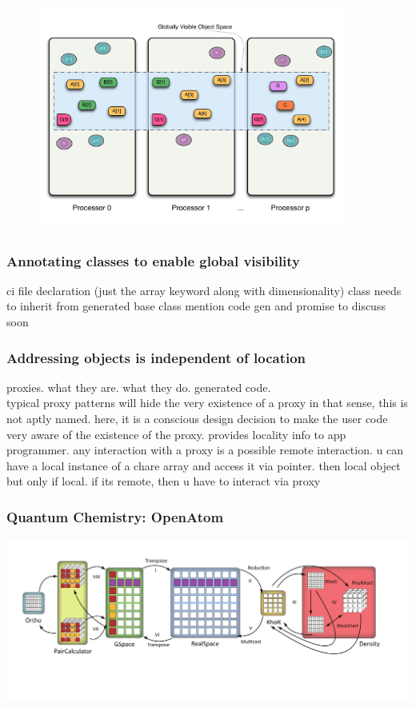 \begin{frame}
  \frametitle{
  }
  \begin{figure}\includegraphics[width=0.9\textwidth]{../figures/progmodel/07-obj-programmer-view.pdf}\end{figure}
\end{frame}


\begin{frame}
  \frametitle{Annotating classes to enable global visibility}
  ci file declaration (just the array keyword along with dimensionality)
  class needs to inherit from generated base class
  mention code gen and promise to discuss soon
\end{frame}


\begin{frame}
  \frametitle{Addressing objects is independent of location}
  proxies. what they are. what they do. generated code.\\
  typical proxy patterns will hide the very existence of a proxy
  in that sense, this is not aptly named.
  here, it is a conscious design decision to make the user code very aware of
  the existence of the proxy. provides locality info to app programmer.
  any interaction with a proxy is a possible remote interaction.
  u can have a local instance of a chare array and access it via pointer. then local object
  but only if local. if its remote, then u have to interact via proxy
\end{frame}


\begin{frame}
\frametitle{Quantum Chemistry: OpenAtom}
\includegraphics[width=\textwidth]{../figures/openatom/control-flow.pdf}
\end{frame}


